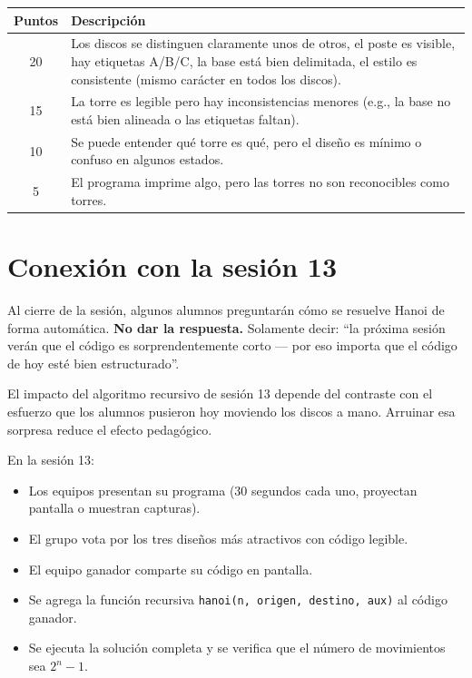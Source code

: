 \documentclass[12pt, oneside]{article}
\begin{document}
\begin{center}
\begin{tabular}{cp{9cm}}
  \toprule
  \textbf{Puntos} & \textbf{Descripción} \\
  \midrule
  20 & Los discos se distinguen claramente unos de otros, el poste es
       visible, hay etiquetas A/B/C, la base está bien delimitada,
       el estilo es consistente (mismo carácter en todos los discos). \\
  15 & La torre es legible pero hay inconsistencias menores (e.g., la
       base no está bien alineada o las etiquetas faltan). \\
  10 & Se puede entender qué torre es qué, pero el diseño es mínimo
       o confuso en algunos estados. \\
   5 & El programa imprime algo, pero las torres no son reconocibles
       como torres. \\
  \bottomrule
\end{tabular}
\end{center}

\section{Conexión con la sesión 13}

\begin{notaprofesor}
  Al cierre de la sesión, algunos alumnos preguntarán cómo se resuelve
  Hanoi de forma automática.  \textbf{No dar la respuesta.}  Solamente
  decir: ``la próxima sesión verán que el código es sorprendentemente
  corto — por eso importa que el código de hoy esté bien estructurado''.

  El impacto del algoritmo recursivo de sesión 13 depende del contraste
  con el esfuerzo que los alumnos pusieron hoy moviendo los discos a mano.
  Arruinar esa sorpresa reduce el efecto pedagógico.
\end{notaprofesor}

En la sesión 13:

\begin{itemize}
  \item Los equipos presentan su programa (30 segundos cada uno, proyectan
        pantalla o muestran capturas).
  \item El grupo vota por los tres diseños más atractivos con código legible.
  \item El equipo ganador comparte su código en pantalla.
  \item Se agrega la función recursiva \texttt{hanoi(n, origen, destino,
        aux)} al código ganador.
  \item Se ejecuta la solución completa y se verifica que el número de
        movimientos sea $2^n - 1$.
\end{itemize}
\end{document}
